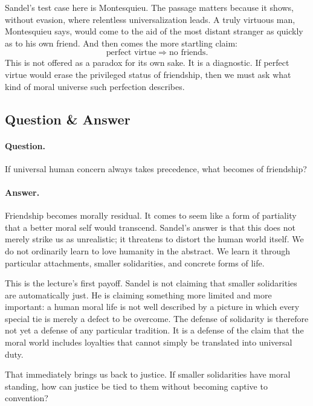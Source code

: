 Sandel's test case here is Montesquieu. The passage matters because it shows, without evasion, where relentless universalization leads. A truly virtuous man, Montesquieu says, would come to the aid of the most distant stranger as quickly as to his own friend. And then comes the more startling claim:
\begin{equation}
\text{perfect virtue}
\Longrightarrow
\text{no friends}.
\end{equation}
This is not offered as a paradox for its own sake. It is a diagnostic. If perfect virtue would erase the privileged status of friendship, then we must ask what kind of moral universe such perfection describes.

\subsection{Question \& Answer}

\paragraph{Question.} If universal human concern always takes precedence, what becomes of friendship?

\paragraph{Answer.} Friendship becomes morally residual. It comes to seem like a form of partiality that a better moral self would transcend. Sandel's answer is that this does not merely strike us as unrealistic; it threatens to distort the human world itself. We do not ordinarily learn to love humanity in the abstract. We learn it through particular attachments, smaller solidarities, and concrete forms of life.

This is the lecture's first payoff. Sandel is not claiming that smaller solidarities are automatically just. He is claiming something more limited and more important: a human moral life is not well described by a picture in which every special tie is merely a defect to be overcome. The defense of solidarity is therefore not yet a defense of any particular tradition. It is a defense of the claim that the moral world includes loyalties that cannot simply be translated into universal duty.

That immediately brings us back to justice. If smaller solidarities have moral standing, how can justice be tied to them without becoming captive to convention?

